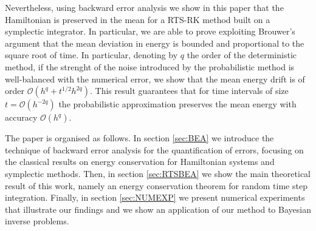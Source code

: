\documentclass{siamart1116}
\numberwithin{theorem}{section}
\newcommand{\OO}{\mathcal{O}}
\newcommand{\corr}[1]{{\color{red}#1}}
\begin{document}
\corr{Nevertheless, using backward error analysis we show in this paper that the Hamiltonian is preserved in the mean for a RTS-RK method built on a symplectic integrator. In particular, we are able to prove} exploiting Brouwer's argument \cite{Bro37} that the mean deviation in energy is bounded and proportional to the square root of time. In particular, denoting by $q$ the order of the deterministic method, \corr{if the strenght of the} noise introduced by the probabilistic method is well-balanced with the numerical error, we show that the mean energy drift is of order $\OO(h^q + t^{1/2}h^{2q})$. This result guarantees that for time intervals of size $t = \OO(h^{-2q})$ the probabilistic approximation \corr{preserves the mean energy with accuracy $\OO(h^q)$.}

The paper is organised as follows. In section \ref{sec:BEA} we introduce the technique of backward error analysis for the quantification of errors, focusing on the classical results on energy conservation for Hamiltonian systems and symplectic methods. Then, in section \ref{sec:RTSBEA} we show the main theoretical result of this work, \corr{namely an energy conservation theorem for random time step integration}. Finally, in section \ref{sec:NUMEXP} we present numerical experiments that \corr{illustrate} our findings and we show \corr{an application} of our method \corr{to} Bayesian inverse problems.
\end{document}
